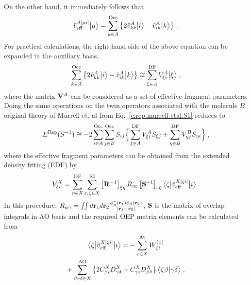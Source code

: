 %
\\ On the other hand, it immediately follows that
%
\begin{equation}
 \hat{v}^{A[\mu i]}_{\rm eff} \Ket{\mu} = 
  \sum_{k\in A}^{\rm Occ} \left\{
     2\hat{v}^A_{kk} \Ket{i} - \hat{v}^A_{ik} \Ket{k}
  \right\} \;.
\end{equation}
%
For practical calculations, the right hand side of the above equation can be expanded 
in the auxiliary basis,
%
\begin{equation} \label{e:v-oep.rep}
  \sum_{k\in A}^{\rm Occ} \left\{
     2\hat{v}^A_{kk} \Ket{i} - \hat{v}^A_{ik} \Ket{k}
  \right\} \cong
  \sum_{\xi\in A}^{\rm DF} 
  V_{\xi i}^A \Ket{\xi} \;,
\end{equation}
%
where the matrix ${\bf V}^A$ can be considered as a set of effective fragment parameters.
Doing the same operations on the twin operators associated with the molecule $B$
original theory of Murrell et. al from Eq.~\eqref{e:rep.murrell-etal.S1}
reduces to
%
\begin{equation} \label{e:rep.murrell-etal.S1.oep}
    E^{\rm Rep}(S^{-1}) \cong 
 -2\sum_{i\in A}^{\rm Occ} \sum_{j\in B}^{\rm Occ}
               S_{ij} \Big\{
           \sum_{\xi \in A}^{\rm DF} V_{\xi i}^A S_{\xi j}
         + \sum_{\eta\in B}^{\rm DF} V_{\eta j}^B S_{\eta i}
                \Big\} \;,
\end{equation}
%
where the
effective fragment parameters
can be obtained 
from the extended density fitting\cite{Blasiak.Bednarska.Choluj.Bartkowiak.JCP.2019} (EDF)
by
%
\begin{equation} \label{e:rep.murrell-etal.S1.oep-edf}
            V_{\xi i}^X = \sum_{\eta\in X}^{\rm DF} 
                          \sum_{\varepsilon,\zeta\in X}^{\rm RI}
                          \left[ {\bf R}^{-1} \right]_{\xi\eta} R_{\eta\varepsilon} 
                          \left[ {\bf S}^{-1} \right]_{\varepsilon\zeta} 
                          \tBraKet{\zeta}{\hat{v}_{\rm eff}^{X[\zeta i]}}{i}
                \;.
\end{equation}
%
In this procedure, $R_{\alpha\gamma}= \iint d{\bf r}_1 d{\bf r}_2 \frac{\phi_{\alpha}^*({\bf r}_1) \phi_{\beta}({\bf r}_2) }{\lvert {\bf r}_1 - {\bf r}_2 \rvert}$, ${\bf S}$ is the matrix of overlap integrals in AO basis
and the required OEP matrix elements can be calculated from
%
\begin{multline} \label{e:rep.murrell-etal.S1.oep-v}
   \tBraKet{\zeta}{\hat{v}_{\rm eff}^{X[\zeta i]}}{i}
     = -\sum_{x\in X}^{\rm At} W_{\zeta i}^{(x)} \\
        + \sum_{\beta\gamma\delta\in X}^{\rm AO}
           \left\{ 
             2 C_{\beta i}^X D_{\gamma\delta}^X - C_{\gamma i}^X D_{\beta \delta}^X
           \right\}
           \BraKet{\zeta\beta}{\gamma\delta} \;,
\end{multline}
